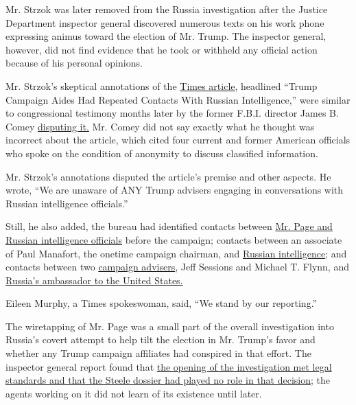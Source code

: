 Mr. Strzok was later removed from the Russia investigation after the
Justice Department inspector general discovered numerous texts on his
work phone expressing animus toward the election of Mr. Trump. The
inspector general, however, did not find evidence that he took or
withheld any official action because of his personal opinions.

Mr. Strzok's skeptical annotations of the
\href{https://www.nytimes.com/2017/02/14/us/politics/russia-intelligence-communications-trump.html}{Times
article}, headlined ``Trump Campaign Aides Had Repeated Contacts With
Russian Intelligence,'' were similar to congressional testimony months
later by the former F.B.I. director James B. Comey
\href{https://www.nytimes.com/2017/06/08/us/politics/james-comey-new-york-times-article-russia.html}{disputing
it.} Mr. Comey did not say exactly what he thought was incorrect about
the article, which cited four current and former American officials who
spoke on the condition of anonymity to discuss classified information.

Mr. Strzok's annotations disputed the article's premise and other
aspects. He wrote, ``We are unaware of ANY Trump advisers engaging in
conversations with Russian intelligence officials.''

Still, he also added, the bureau had identified contacts between
\href{https://www.nytimes.com/2017/04/04/us/politics/carter-page-trump-russia.html}{Mr.
Page and Russian intelligence officials} before the campaign; contacts
between an associate of Paul Manafort, the onetime campaign chairman,
and
\href{https://www.nytimes.com/2019/02/23/us/politics/konstantin-kilimnik-russia.html}{Russian
intelligence}; and contacts between two
\href{https://www.nytimes.com/2017/06/12/us/politics/sessions-is-likely-to-be-grilled-on-reports-of-meeting-with-russian-envoy.html}{campaign
advisers}, Jeff Sessions and Michael T. Flynn, and
\href{https://www.nytimes.com/2020/05/29/us/politics/flynn-russian-ambassador-transcripts.html}{Russia's
ambassador to the United States.}

Eileen Murphy, a Times spokeswoman, said, ``We stand by our reporting.''

The wiretapping of Mr. Page was a small part of the overall
investigation into Russia's covert attempt to help tilt the election in
Mr. Trump's favor and whether any Trump campaign affiliates had
conspired in that effort. The inspector general report found that
\href{https://www.nytimes.com/2019/12/09/us/politics/fbi-ig-report-russia-investigation.html}{the
opening of the investigation met legal standards and that the Steele
dossier had played no role in that decision}; the agents working on it
did not learn of its existence until later.

